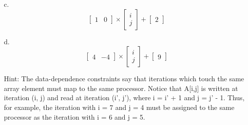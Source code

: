 \begin{problem}
\item c.
$$
	\begin{bmatrix}
		1 & 0
	\end{bmatrix}
	\times
	\begin{bmatrix}
		i \\
		j
	\end{bmatrix}
	+
	\begin{bmatrix}
		2
	\end{bmatrix}
$$

\item d.
$$
	\begin{bmatrix}
		4 & -4
	\end{bmatrix}
	\times
	\begin{bmatrix}
		i \\
		j
	\end{bmatrix}
	+
	\begin{bmatrix}
		9
	\end{bmatrix}
$$

\item {\color{red} Hint: The data-dependence constraints say that iterations which touch the same array element must map to the same processor. Notice that A[i,j] is written at iteration (i, j) and read at iteration (i', j'), where i = i' + 1 and j = j' - 1. Thus, for example, the iteration with i = 7 and j = 4 must be assigned to the same processor as the iteration with i = 6 and j = 5.}

\end{problem}


